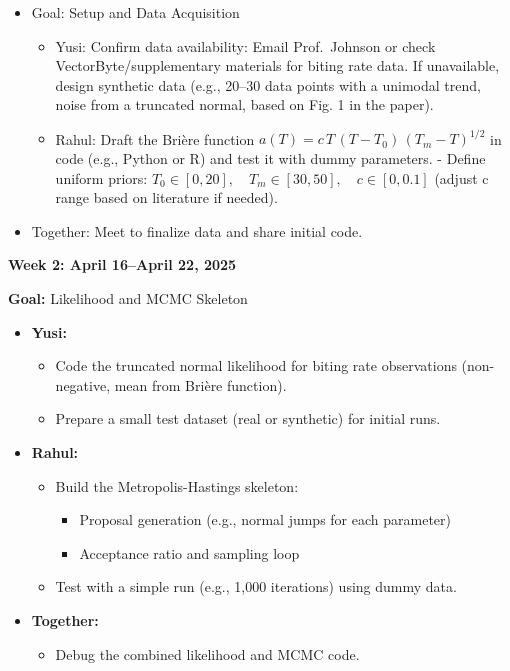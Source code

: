 \documentclass[
  letterpaper,
  DIV=11,
  numbers=noendperiod]{scrreprt}
\providecommand{\tightlist}{%
  \setlength{\itemsep}{0pt}\setlength{\parskip}{0pt}}
\begin{document}
\begin{itemize}
\tightlist
\item
  Goal: Setup and Data Acquisition

  \begin{itemize}
  \item
    Yusi: Confirm data availability: Email Prof.~Johnson or check
    VectorByte/supplementary materials for biting rate data. If
    unavailable, design synthetic data (e.g., 20--30 data points with a
    unimodal trend, noise from a truncated normal, based on Fig. 1 in
    the paper).
  \item
    Rahul: Draft the Brière function
    \(a(T) = c\,T\,(T - T_0)\,(T_m - T)^{1/2}\) in code (e.g., Python or
    R) and test it with dummy parameters. - Define uniform priors:
    \(T_0 \in [0, 20], \quad T_m \in [30, 50], \quad c \in [0, 0.1]\)
    (adjust c range based on literature if needed).
  \end{itemize}
\item
  Together: Meet to finalize data and share initial code.
\end{itemize}

\textbf{Week 2: April 16--April 22, 2025}

\textbf{Goal:} Likelihood and MCMC Skeleton

\begin{itemize}
\tightlist
\item
  \textbf{Yusi:}

  \begin{itemize}
  \tightlist
  \item
    Code the truncated normal likelihood for biting rate observations
    (non-negative, mean from Brière function).
  \item
    Prepare a small test dataset (real or synthetic) for initial runs.
  \end{itemize}
\item
  \textbf{Rahul:}

  \begin{itemize}
  \tightlist
  \item
    Build the Metropolis-Hastings skeleton:

    \begin{itemize}
    \tightlist
    \item
      Proposal generation (e.g., normal jumps for each parameter)
    \item
      Acceptance ratio and sampling loop
    \end{itemize}
  \item
    Test with a simple run (e.g., 1,000 iterations) using dummy data.
  \end{itemize}
\item
  \textbf{Together:}

  \begin{itemize}
  \tightlist
  \item
    Debug the combined likelihood and MCMC code.
  \end{itemize}
\end{itemize}
\end{document}
